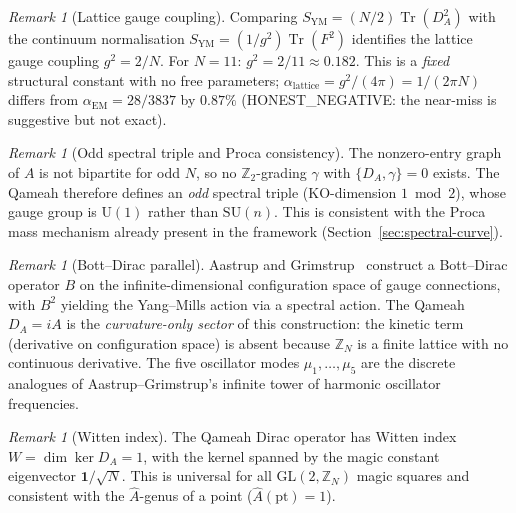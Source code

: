 \documentclass[aps,prd,twocolumn,superscriptaddress,floatfix,nofootinbib]{revtex4-2}
\theoremstyle{definition}
\theoremstyle{remark}
\newtheorem{remark}[theorem]{Remark}
\begin{document}
\begin{remark}[Lattice gauge coupling]
\label{rem:lattice-coupling}
Comparing $S_{\mathrm{YM}} = (N/2)\operatorname{Tr}(D_A^2)$
with the continuum normalisation
$S_{\mathrm{YM}} = (1/g^2)\operatorname{Tr}(F^2)$ identifies
the lattice gauge coupling $g^2 = 2/N$.
For $N=11$: $g^2 = 2/11 \approx 0.182$.
This is a \emph{fixed} structural constant with no free parameters;
$\alpha_{\mathrm{lattice}} = g^2/(4\pi) = 1/(2\pi N)$ differs from
$\alpha_{\mathrm{EM}} = 28/3837$ by $0.87\%$
(HONEST\_NEGATIVE: the near-miss is suggestive but not exact).
\end{remark}

\begin{remark}[Odd spectral triple and Proca consistency]
\label{rem:odd-spectral-triple}
The nonzero-entry graph of $A$ is not bipartite for odd $N$,
so no $\mathbb{Z}_2$-grading $\gamma$ with $\{D_A,\gamma\}=0$
exists.  The Qameah therefore defines an \emph{odd} spectral triple
(KO-dimension $1 \bmod 2$), whose gauge group is $\mathrm{U}(1)$
rather than $\mathrm{SU}(n)$.
This is consistent with the Proca mass mechanism
already present in the framework (Section~\ref{sec:spectral-curve}).
\end{remark}

\begin{remark}[Bott--Dirac parallel]
\label{rem:bott-dirac}
Aastrup and Grimstrup~\cite{aastrup2025} construct a Bott--Dirac
operator $B$ on the infinite-dimensional configuration space of
gauge connections, with $B^2$ yielding the Yang--Mills action
via a spectral action.  The Qameah $D_A = iA$ is the
\emph{curvature-only sector} of this construction: the kinetic term
(derivative on configuration space) is absent because
$\mathbb{Z}_N$ is a finite lattice with no continuous derivative.
The five oscillator modes $\mu_1,\ldots,\mu_5$ are the discrete
analogues of Aastrup--Grimstrup's infinite tower of harmonic
oscillator frequencies.
\end{remark}

\begin{remark}[Witten index]
\label{rem:witten-index}
The Qameah Dirac operator has Witten index $W = \dim\ker D_A = 1$,
with the kernel spanned by the magic constant eigenvector $\mathbf{1}/\sqrt{N}$.
This is universal for all GL$(2,\mathbb{Z}_N)$ magic squares
and consistent with the $\hat{A}$-genus of a point ($\hat{A}(\mathrm{pt}) = 1$).
\end{remark}

\end{document}
